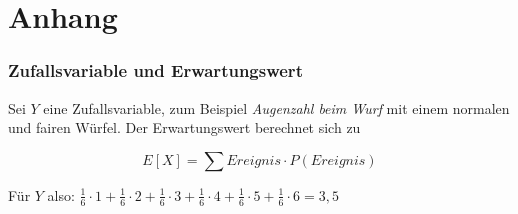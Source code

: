 \documentclass{scrartcl}%
\begin{document}
    \hrulefill

    \section*{Anhang}
    \label{sec:anhang}

    \subsubsection*{Zufallsvariable und Erwartungswert}
    \label{sec:zufallsvariableUndErwartungswert}
    Sei $Y$ eine Zufallsvariable, zum Beispiel \textit{Augenzahl beim Wurf} mit einem normalen und fairen Würfel. \newline
    Der Erwartungswert berechnet sich zu

    \begin{equation*}
        E[X] = \sum Ereignis \cdot P(Ereignis)
    \end{equation*}

    Für $Y$ also: $\frac{1}{6} \cdot 1 + \frac{1}{6} \cdot 2 + \frac{1}{6} \cdot 3 +
    \frac{1}{6} \cdot 4 + \frac{1}{6} \cdot 5 + \frac{1}{6} \cdot 6  = 3,5$
\end{document}
